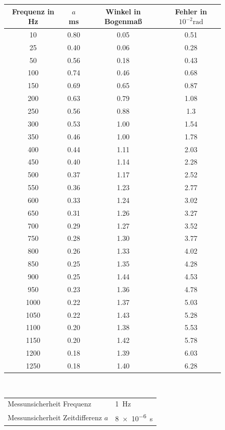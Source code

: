 \begin{figure}[h!]
	\centering
	\begin{tabular}{c|c|c|c}
	Frequenz in \si{\hertz}&  $a$ \si{\milli\second} & Winkel in Bogenmaß & Fehler in $10^{-2}\si{\radian}$ \\
		\hline
		10 & 0.80  & 0.05 & 0.51 \\
		25 & 0.40  & 0.06 & 0.28 \\
		50 & 0.56 & 0.18 & 0.43 \\
		100 & 0.74 & 0.46 & 0.68 \\
		150 & 0.69 & 0.65 & 0.87 \\
		200 & 0.63 & 0.79 & 1.08 \\
		250 & 0.56 & 0.88 & 1.3  \\
		300 & 0.53 & 1.00    & 1.54 \\
		350 & 0.46 & 1.00    & 1.78 \\
		400 & 0.44 & 1.11 & 2.03 \\
		450 & 0.40 & 1.14 & 2.28 \\
		500 & 0.37 & 1.17 & 2.52 \\
		550 & 0.36 & 1.23 & 2.77 \\
		600 & 0.33 & 1.24 & 3.02 \\
		650 & 0.31 & 1.26 & 3.27 \\
		700 & 0.29 & 1.27 & 3.52 \\
		750 & 0.28 & 1.30  & 3.77 \\
		800 & 0.26 & 1.33 & 4.02 \\
		850 & 0.25 & 1.35 & 4.28 \\
		900 & 0.25 & 1.44 & 4.53 \\
		950 & 0.23 & 1.36 & 4.78 \\
		1000 & 0.22 & 1.37 & 5.03 \\
		1050 & 0.22 & 1.43 & 5.28 \\
		1100 & 0.20  & 1.38 & 5.53 \\
		1150 & 0.20  & 1.42 & 5.78 \\
		1200 & 0.18 & 1.39 & 6.03 \\
		1250 & 0.18 & 1.40  & 6.28 \\
		\end{tabular}
	\label{tab:phasenverschub}
	\\
	\vspace{1cm}
	\begin{tabular}{ll}
		Messunsicherheit Frequenz & \SI{1}{\hertz} \\
		Messunsicherheit Zeitdifferenz $a$ & \SI{8e-6}{\second}
	\end{tabular}	
\end{figure}

